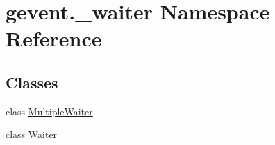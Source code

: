\hypertarget{namespacegevent_1_1__waiter}{}\section{gevent.\+\_\+waiter Namespace Reference}
\label{namespacegevent_1_1__waiter}
\subsection*{Classes}
\begin{DoxyCompactItemize}
\item 
class \hyperlink{classgevent_1_1__waiter_1_1_multiple_waiter}{Multiple\+Waiter}
\item 
class \hyperlink{classgevent_1_1__waiter_1_1_waiter}{Waiter}
\end{DoxyCompactItemize}
